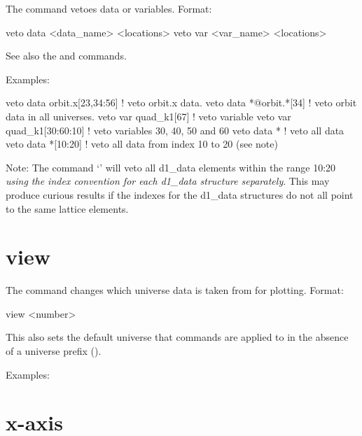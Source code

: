 {{{The  command vetoes data or variables. Format:
\begin{example}
  veto data <data_name> <locations>
  veto var <var_name> <locations>
\end{example}

\vskip 0.2in 

See also the  and  commands.

Examples:
\begin{example}
  veto data orbit.x[23,34:56]  ! veto orbit.x data.
  veto data *@orbit.*[34]      ! veto orbit data in all universes.
  veto var quad_k1[67]         ! veto variable
  veto var quad_k1[30:60:10]   ! veto variables 30, 40, 50 and 60
  veto data *                  ! veto all data
  veto data *[10:20]           ! veto all data from index 10 to 20 (see note)
\end{example}

Note: The command `' will veto all d1\_data elements
within the range 10:20 \textit{using the index convention for each d1\_data
structure separately}. This may produce curious results if the
indexes for the d1\_data structures do not all point to the same lattice
elements. 

\section{view}
\label{s:view}

The  command changes which universe data is taken from for
plotting. Format:
\begin{example}
  view <number>
\end{example}

\vskip 0.1in 

This also sets the default universe that commands are applied to in
the absence of a universe prefix ().

Examples:

\section{x-axis}
\label{s:x.axis}

}}}
